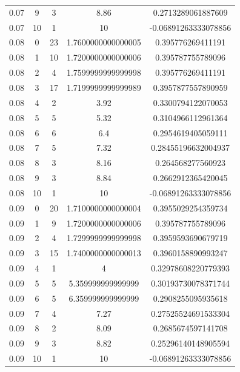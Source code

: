 \documentclass[paper=a4, fontsize=11pt]{scrartcl} %
\numberwithin{equation}{section} %
\numberwithin{figure}{section} %
\numberwithin{table}{section} %
\begin{document}
\begin{center}
\begin{tabular}{ |c|c|c|c|c| }
    0.07 & 9 & 3 & 8.86 & 0.2713289061887609 \\
    0.07 & 10 & 1 & 10 & -0.06891263333078856 \\
    0.08 & 0 & 23 & 1.7600000000000005 & 0.395776269411191 \\
    0.08 & 1 & 10 & 1.7200000000000006 & 0.395787755789096 \\
    0.08 & 2 & 4 & 1.7599999999999998 & 0.395776269411191 \\
    0.08 & 3 & 17 & 1.7199999999999989 & 0.3957877557890959 \\
    0.08 & 4 & 2 & 3.92 & 0.3300794122070053 \\
    0.08 & 5 & 5 & 5.32 & 0.3104966112961364 \\
    0.08 & 6 & 6 & 6.4 & 0.2954619405059111 \\
    0.08 & 7 & 5 & 7.32 & 0.28455196632004937 \\
    0.08 & 8 & 3 & 8.16 & 0.264568277560923 \\
    0.08 & 9 & 3 & 8.84 & 0.2662912365420045 \\
    0.08 & 10 & 1 & 10 & -0.06891263333078856 \\
    0.09 & 0 & 20 & 1.7100000000000004 & 0.3955029254359734 \\
    0.09 & 1 & 9 & 1.7200000000000006 & 0.395787755789096 \\
    0.09 & 2 & 4 & 1.7299999999999998 & 0.3959593690679719 \\
    0.09 & 3 & 15 & 1.7400000000000013 & 0.3960158890993247 \\
    0.09 & 4 & 1 & 4 & 0.32978608220779393 \\
    0.09 & 5 & 5 & 5.359999999999999 & 0.30193730078371744 \\
    0.09 & 6 & 5 & 6.359999999999999 & 0.2908255095935618 \\
    0.09 & 7 & 4 & 7.27 & 0.27525524691533304 \\
    0.09 & 8 & 2 & 8.09 & 0.2685674597141708 \\
    0.09 & 9 & 3 & 8.82 & 0.25296140148905594 \\
    0.09 & 10 & 1 & 10 & -0.06891263333078856 \\
    \hline
\end{tabular}
\end{center}
\end{document}
